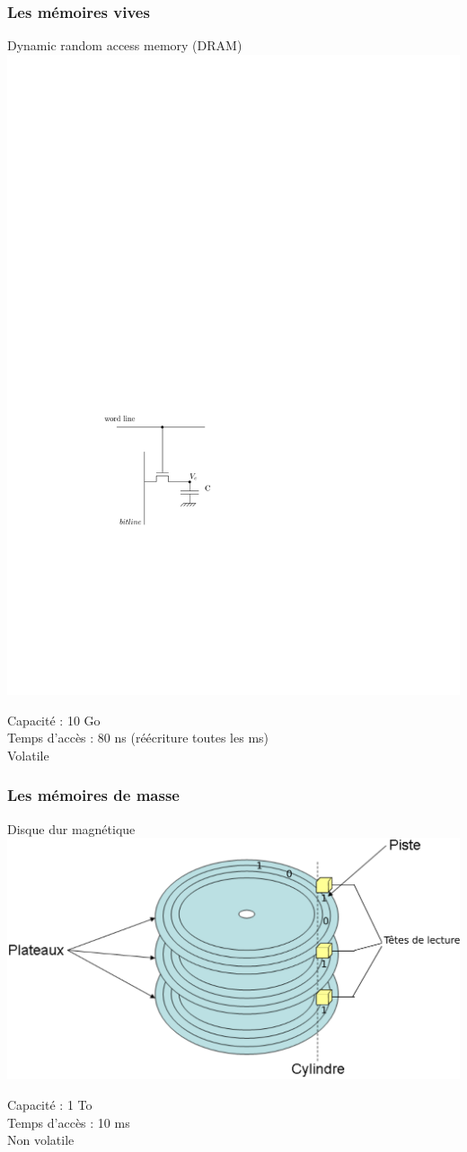\documentclass{beamer}
\begin{document}
\begin{frame}
\frametitle{Les mémoires vives}
\begin{block}{Dynamic random access memory (DRAM)}
\centering\includegraphics[width=0.4\linewidth]{Figs/dram_inner.pdf}
\end{block}

Capacité : 10 Go\\
Temps d'accès : 80 ns (réécriture toutes les ms)\\
Volatile
\end{frame}

\begin{frame}
\frametitle{Les mémoires de masse}
\begin{block}{Disque dur magnétique}
\centering\includegraphics[width=0.5\linewidth]{Figs/dd.pdf}
\end{block}

Capacité : 1 To\\
Temps d'accès : 10 ms\\
Non volatile
\end{frame}





\end{document}
